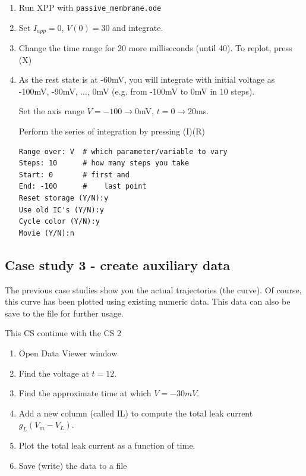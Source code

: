 \begin{enumerate}
\item Run XPP with \verb!passive_membrane.ode!

\item Set $I_{app}=0$, $V(0) = 30$ and integrate.

\item Change the time range for 20 more milliseconds (until 40). To
  replot, press (X)

\item As the rest state is at -60mV, you will integrate with initial
  voltage as -100mV, -90mV, ..., 0mV (e.g. from -100mV to 0mV in 10
  steps). 

Set the axis range $V=-100 \rightarrow 0$mV, $t=0\rightarrow 20$ms.

Perform the series of integration by pressing (I)(R)
\begin{verbatim}
Range over: V  # which parameter/variable to vary
Steps: 10      # how many steps you take
Start: 0       # first and
End: -100      #    last point
Reset storage (Y/N):y
Use old IC's (Y/N):y
Cycle color (Y/N):y
Movie (Y/N):n
\end{verbatim}
\end{enumerate}

\subsection{Case study 3 - create auxiliary data}
\label{sec:case-study-3}

The previous case studies show you the actual trajectories (the
curve). Of course, this curve has been plotted using existing numeric
data. This data can also be save to the file for further usage.

This CS continue with the CS 2

\begin{enumerate}
\item Open Data Viewer window

\item Find the voltage at $t=12$. 

\item Find the approximate time at which $V=-30mV$.

\item Add a new column (called IL) to compute the total leak current
  $g_L(V_m-V_L)$.

\item Plot the total leak current as a function of time.

\item Save (write) the data to a file
\end{enumerate}


